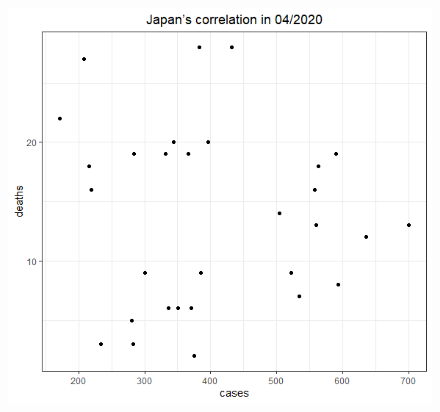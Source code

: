 \documentclass[a4paper]{article}
\theoremstyle{definition}
\begin{document}
\begin{enumerate}[1)]
\begin{figure}[H]
\begin{center}
        \includegraphics[scale = 0.3]{ix/ix.2/JPN_04_2020.png}
        

\end{center}
\end{figure}
\end{enumerate}
\end{document}
